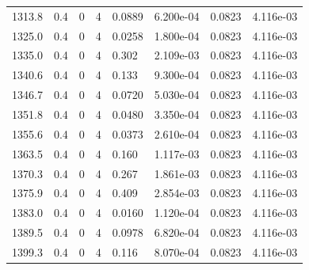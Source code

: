 \documentclass[preview]{standalone}
\begin{document}
{{{{{{{\begin{tabular}{L{1.2cm}C{1.2cm} C{0.3cm}C{0.5cm} C{1.4cm}C{1.4cm} C{1.4cm}C{1.4cm}}
  1313.8  &   0.4  & 0     &  4 &  0.0889  & 6.200e-04  & 0.0823 &  4.116e-03   \\ 
  1325.0  &   0.4  & 0     &  4 &  0.0258  & 1.800e-04  & 0.0823 &  4.116e-03   \\ 
  1335.0  &   0.4  & 0     &  4 &  0.302  & 2.109e-03  & 0.0823 &  4.116e-03   \\ 
  1340.6  &   0.4  & 0     &  4 &  0.133  & 9.300e-04  & 0.0823 &  4.116e-03   \\ 
  1346.7  &   0.4  & 0     &  4 &  0.0720  & 5.030e-04  & 0.0823 &  4.116e-03   \\ 
  1351.8  &   0.4  & 0     &  4 &  0.0480  & 3.350e-04  & 0.0823 &  4.116e-03   \\ 
  1355.6  &   0.4  & 0     &  4 &  0.0373  & 2.610e-04  & 0.0823 &  4.116e-03   \\ 
  1363.5  &   0.4  & 0     &  4 &  0.160  & 1.117e-03  & 0.0823 &  4.116e-03   \\ 
  1370.3  &   0.4  & 0     &  4 &  0.267  & 1.861e-03  & 0.0823 &  4.116e-03   \\ 
  1375.9  &   0.4  & 0     &  4 &  0.409  & 2.854e-03  & 0.0823 &  4.116e-03   \\ 
  1383.0  &   0.4  & 0     &  4 &  0.0160  & 1.120e-04  & 0.0823 &  4.116e-03   \\ 
  1389.5  &   0.4  & 0     &  4 &  0.0978  & 6.820e-04  & 0.0823 &  4.116e-03   \\ 
  1399.3  &   0.4  & 0     &  4 &  0.116  & 8.070e-04  & 0.0823 &  4.116e-03   \\ 
\hline 
\end{tabular} 

}}}}}}}
\end{document}
